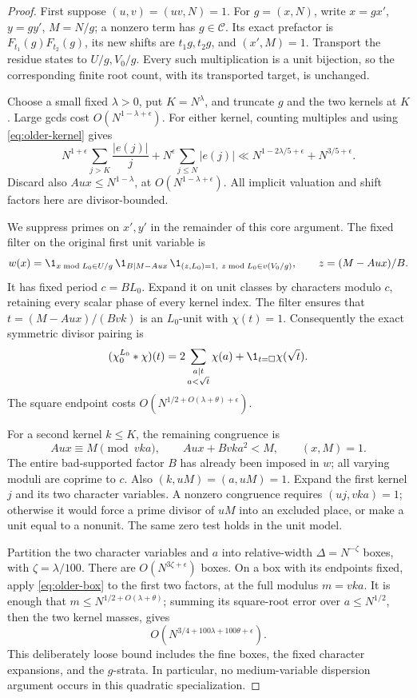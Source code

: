\begin{proof}
First suppose \((u,v)=(uv,N)=1\).
For \(g=(x,N)\), write \(x=gx'\), \(y=gy'\), \(M=N/g\);
a nonzero term has \(g\in\mathcal C\).
Its exact prefactor is \(F_{t_1}(g)F_{t_2}(g)\), its new shifts
are \(t_1g,t_2g\), and \((x',M)=1\).
Transport the residue states to \(U/g,V_0/g\).
Every such multiplication is a unit bijection, so the corresponding
finite root count, with its transported target, is unchanged.

Choose a small fixed \(\lambda>0\), put \(K=N^\lambda\), and truncate
\(g\) and the two kernels at \(K\).
Large gcds cost \(O(N^{1-\lambda+\epsilon})\).
For either kernel, counting multiples and using
\eqref{eq:older-kernel} gives
\[
 N^{1+\epsilon}\sum_{j>K}\frac{|e(j)|}{j}
   +N^\epsilon\sum_{j\le N}|e(j)|
       \ll N^{1-2\lambda/5+\epsilon}+N^{3/5+\epsilon}.
\]
Discard also \(Au x\le N^{1-\lambda}\), at
\(O(N^{1-\lambda+\epsilon})\).
All implicit valuation and shift factors here are divisor-bounded.

We suppress primes on \(x',y'\) in the remainder of this core argument.
The fixed filter on the original first unit variable is
\[
 w(x)=\1_{x\bmod L_0\in U/g}\,
       \1_{B\mid M-Au x}\,
       \1_{(z,L_0)=1,\ z\bmod L_0\in v(V_0/g)},\qquad
                       z=(M-Au x)/B.
\]
It has fixed period \(c=BL_0\).  Expand it on unit classes by characters
modulo \(c\), retaining every scalar phase of every kernel index.
The filter ensures that
\(t=(M-Au x)/(Bvk)\) is an \(L_0\)-unit with \(\chi(t)=1\).
Consequently the exact symmetric divisor pairing is
\[
 (\chi_0^{L_0}*\chi)(t)
  =2\sum_{\substack{a\mid t\\a<\sqrt t}}\chi(a)
                         +\1_{t=\square}\chi(\sqrt t).
\]
The square endpoint costs \(O(N^{1/2+O(\lambda+\theta)+\epsilon})\).

For a second kernel \(k\le K\), the remaining congruence is
\[
       Au x\equiv M\pmod{vka},\qquad
       Au x+Bvka^2<M,\qquad (x,M)=1 .
\]
The entire bad-supported factor \(B\) has already been imposed in
\(w\); all varying moduli are coprime to \(c\).
Also \((k,uM)=(a,uM)=1\).
Expand the first kernel \(j\) and its two character variables.
A nonzero congruence requires \((uj,vka)=1\); otherwise it would
force a prime divisor of \(uM\) into an excluded place, or make a
unit equal to a nonunit.  The same zero test holds in the unit model.

Partition the two character variables and \(a\) into relative-width
\(\Delta=N^{-\zeta}\) boxes, with \(\zeta=\lambda/100\).
There are \(O(N^{3\zeta+\epsilon})\) boxes.
On a box with its endpoints fixed, apply \eqref{eq:older-box} to
the first two factors, at the full modulus \(m=vka\).
It is enough that \(m\le N^{1/2+O(\lambda+\theta)}\);
summing its square-root error over \(a\le N^{1/2}\),
then the two kernel masses, gives
\begin{equation}\label{eq:older-box-budget}
 O(N^{3/4+100\lambda+100\theta+\epsilon}).
\end{equation}
This deliberately loose bound includes the fine boxes, the fixed
character expansions, and the \(g\)-strata.
In particular, no medium-variable dispersion argument occurs
in this quadratic specialization.


\end{proof}
